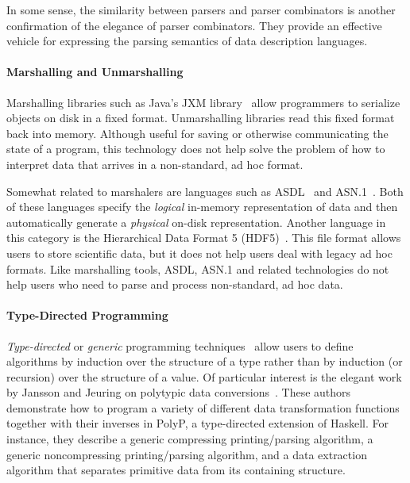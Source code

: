 In some sense, the similarity between \ddc{} parsers and parser combinators is another confirmation of the elegance of parser combinators. They provide an effective vehicle for expressing the parsing semantics of data description languages.

\paragraph*{Marshalling and Unmarshalling}

Marshalling libraries such as Java's JXM library~\cite{jxm} 
allow programmers to
 serialize objects on disk in a fixed format.
Unmarshalling libraries read this fixed format back 
into memory.  Although useful for saving or otherwise communicating 
the state of a program, 
this technology does not help solve the problem of how to interpret
data that arrives in a non-standard, ad hoc format.

Somewhat related to marshalers are languages such as
\textsc{ASDL}~\cite{asdl} and \textsc{ASN.1}~\cite{asn}.  Both of
these languages specify the {\em logical\/} in-memory representation of
data and then automatically generate a {\em physical\/} on-disk
representation.  Another language in this category is the Hierarchical Data
Format 5 (HDF5)~\cite{hdf5}.  This file format allows users to store
scientific data, but it does not help users deal with legacy ad hoc
formats.  Like marshalling tools, ASDL, ASN.1 and related technologies
do not help users who need to parse and process non-standard, ad hoc data.


\paragraph*{Type-Directed Programming}
{\em Type-directed} or
{\em generic} programming techniques~\cite{jansson+:97,jansson+:99,jansson:phdthesis,hinze+:generic-programming,jansson+:02,lammel+:syb} allow users to
define algorithms by induction over the structure of a type rather 
than by induction (or recursion) over the structure of a value.  
Of particular interest is the
elegant work by Jansson and Jeuring on polytypic data 
conversions~\cite{jansson+:97,jansson+:99,jansson:phdthesis,jansson+:02}.
These authors demonstrate how to program a variety of different data 
transformation functions together with their inverses in PolyP, a 
type-directed extension of Haskell. For instance, they describe a 
generic compressing printing/parsing algorithm, a generic 
noncompressing printing/parsing algorithm, and a data
extraction algorithm that separates primitive data from its
containing structure.  

